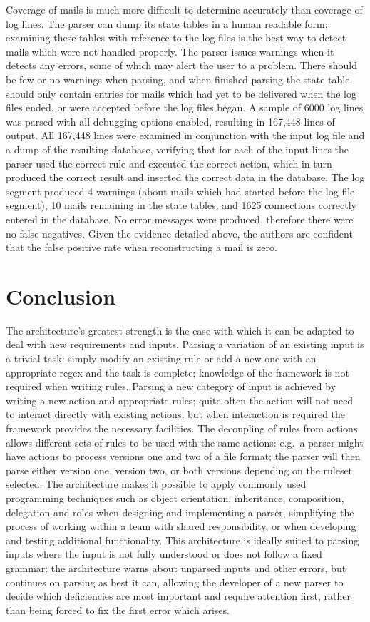 \documentclass[draft]{svmult}
\begin{document}
Coverage of mails is much more difficult to determine accurately than
coverage of log lines.  The parser can dump its state tables in a human
readable form; examining these tables with reference to the log files is
the best way to detect mails which were not handled properly.  The parser
issues warnings when it detects any errors, some of which may alert the
user to a problem.  There should be few or no warnings when parsing, and
when finished parsing the state table should only contain entries for mails
which had yet to be delivered when the log files ended, or were accepted
before the log files began.  A sample of 6000 log lines was parsed with all
debugging options enabled, resulting in 167,448 lines of output.  All
167,448 lines were examined in conjunction with the input log file and a
dump of the resulting database, verifying that for each of the input lines
the parser used the correct rule and executed the correct action, which in
turn produced the correct result and inserted the correct data in the
database.  The log segment produced 4 warnings (about mails which had
started before the log file segment), 10 mails remaining in the state
tables, and 1625 connections correctly entered in the database.  No error
messages were produced, therefore there were no false negatives.  Given the
evidence detailed above, the authors are confident that the false positive
rate when reconstructing a mail is zero.


\section{Conclusion}

The architecture's greatest strength is the ease with which it can be
adapted to deal with new requirements and inputs.  Parsing a variation of
an existing input is a trivial task: simply modify an existing rule or add
a new one with an appropriate regex and the task is complete; knowledge of
the framework is not required when writing rules.  Parsing a new category
of input is achieved by writing a new action and appropriate rules; quite
often the action will not need to interact directly with existing actions,
but when interaction is required the framework provides the necessary
facilities.  The decoupling of rules from actions allows different sets of
rules to be used with the same actions: e.g.\ a parser might have actions
to process versions one and two of a file format; the parser will then
parse either version one, version two, or both versions depending on the
ruleset selected.  The architecture makes it possible to apply commonly
used programming techniques such as object orientation, inheritance,
composition, delegation and roles when designing and implementing a parser,
simplifying the process of working within a team with shared
responsibility, or when developing and testing additional functionality.
This architecture is ideally suited to parsing inputs where the input is
not fully understood or does not follow a fixed grammar: the architecture
warns about unparsed inputs and other errors, but continues on parsing as
best it can, allowing the developer of a new parser to decide which
deficiencies are most important and require attention first, rather than
being forced to fix the first error which arises.
\end{document}
